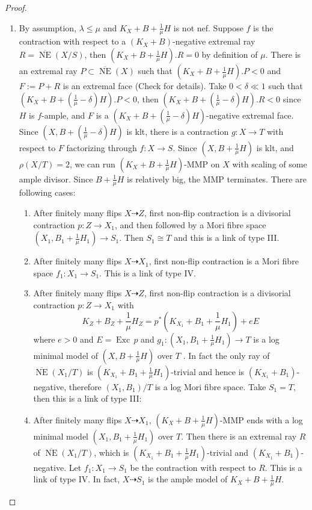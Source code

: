 \documentclass[11pt]{amsart}
\numberwithin{equation}{section}
\begin{document}
\begin{proof}
\begin{enumerate}
  \item\label{a} By assumption,  $\lambda\leqslant \mu$ and   $ K_X+B+\frac{1}{\mu}H $ is not nef. Suppose $ f $ is the contraction with respect to a $ (K_X+B) $-negative extremal ray $ R= \overline{\operatorname{ NE }}(X/S) $, then $ (K_X+B+\frac{1}{\mu}H).R=0 $ by definition of $ \mu $. There is an extremal ray $ P \subset \overline{\operatorname{ NE }}(X) $ such that $ (K_X+B+\frac{1}{\mu}H).P<0 $ and $ F:=P+R $ is an extremal face  (Check \cite[5.4.2]{cortiFactoringBirationalMaps} for details). Take  $ 0<\delta\ll 1 $ such that $ (K_X+B+(\frac{1}{\mu}-\delta)H).P<0 $, then $  (K_X+B+(\frac{1}{\mu}-\delta)H).R<0 $ since $H$ is $f$-ample, and $ F $ is a $  (K_X+B+(\frac{1}{\mu}-\delta)H) $-negative extremal face. Since $ (X,B+(\frac{1}{\mu}-\delta)H) $ is klt, there is  a contraction $ g:X\to T $ with respect  to $ F $ factorizing through $ f:X\to S $. Since  $ (X,B+\frac{1}{\mu}H) $ is klt, and $ \rho(X/T)=2 $,  we can  run $ (K_X+B+\frac{1}{\mu}H) $-MMP on $ X  $ with scaling of some ample divisor.  Since $ B+\frac{1}{\mu}H $ is relatively big,  the MMP terminates. There are following cases: 
  \begin{enumerate}
    \item\label{a1} 
After finitely many flips $ X\dashrightarrow Z $, first non-flip contraction is a divisorial contraction $ p:Z\to X_1 $, and then followed by a Mori fibre space $(X_{1},B_{1}+\frac{1}{\mu}H_{1} )\to S_{1}$. 
    Then  $S_{1} \cong T$ and this is a link of type III.     
   \item\label{a2}
      After finitely many flips $ X\dashrightarrow X_1 $, first non-flip contraction is a Mori fibre space $ f_1:X_1\to S_{1} $. This is a link of type IV.  
    \item \label{a3}
      After finitely many flips $ X\dashrightarrow Z $, first non-flip contraction is a divisorial contraction $ p:Z\to X_1$ with 
    \[ K_Z+B_Z+\frac{1}{\mu}H_Z=p^*(K_{X_1}+B_1+\frac{1}{\mu}H_1)+eE \]
    where $ e>0 $ and  $E=\operatorname{Exc}\,p$ and  $g_{1}: (X_1,B_1+\frac{1}{\mu}H_1) \to T$ is a log minimal model of $(X,B+\frac{1}{\mu}H)$ over $T$ . In fact the only ray of $ \overline{\operatorname{NE}}(X_1/T) $ is $ (K_{X_1}+B_1+\frac{1}{\mu}H_1) $-trivial and hence is $ (K_{X_1}+B_1) $-negative, therefore $ (X_1,B_1)/T $ is a log Mori fibre space. Take $ S_1=T $, then this is a link of type III:
  \item \label{a4}After finitely many flips $ X\dashrightarrow X_1 $, $(K_{X}+B+\frac{1}{\mu}H)$-MMP ends with a log minimal model $ (X_1,B_1+\frac{1}{\mu}H_1) $ over $T $. Then there is an extremal ray $R$ of $ \overline{\operatorname{NE}}(X_1/T) $, which is $ (K_{X_1}+B_1+\frac{1}{\mu}H_1) $-trivial and $ (K_{X_1}+B_1) $-negative. Let $ f_1:X_1\to S_1 $ be the contraction with respect to $R$. This is a link of type IV. In fact, $X \dashrightarrow  S_{1}$ is the ample model of $K_{X}+B+\frac{1}{\mu}H$.

\end{enumerate}
\end{enumerate}
\end{proof}
\end{document}

